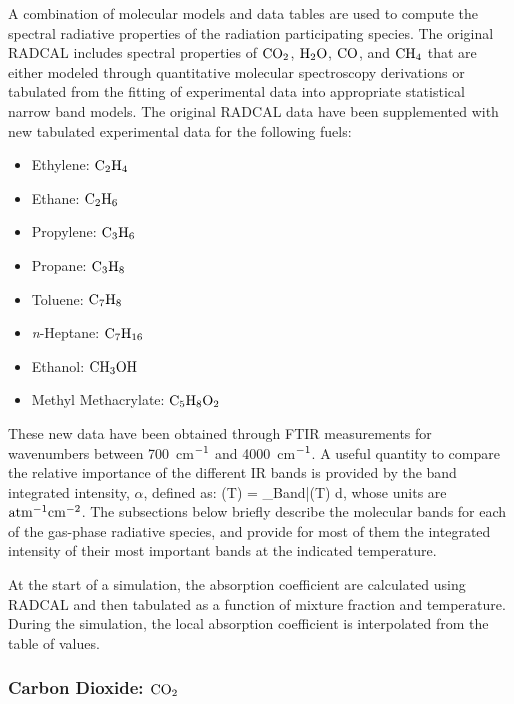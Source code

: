 A combination of molecular models and data tables are used to compute the spectral radiative
properties of the radiation participating species.
The original RADCAL includes spectral properties of $\rm CO_2$, $\rm H_2O$, $\rm CO$, and
$\rm CH_4$ that are either modeled through quantitative molecular spectroscopy derivations
or tabulated from the fitting of experimental data into appropriate statistical narrow band models.
The original RADCAL data have been supplemented with new tabulated experimental data
for the following fuels:
\begin{itemize}
  \item Ethylene:  $\rm C_2H_4$
  \item Ethane:    $\rm C_2H_6$
  \item Propylene: $\rm C_3H_6$
  \item Propane:   $\rm C_3H_8$
  \item Toluene:   $\rm C_7H_8$
  \item \textit{n}-Heptane: $\rm C_7H_{16}$
  \item Ethanol:   $\rm CH_3OH$
  \item Methyl Methacrylate: $\rm C_5H_8O_2$
\end{itemize}
These new data have been obtained through FTIR measurements for wavenumbers between 700~cm$\rm ^{-1}$ and 4000~cm$\rm ^{-1}$. A useful quantity to compare the relative importance of the different IR bands is provided by the band integrated intensity, $\alpha$, defined as:
\be
  \alpha(T) = \displaystyle\int_{Band}\bar{\kappa}(T) \; d\nu,
\ee
whose units are $\rm {atm^{-1} cm^{-2}}$. The subsections below briefly describe the molecular bands for each of the gas-phase radiative species, and provide for most of them the integrated intensity of their most important bands at the indicated temperature.

At the start of a simulation, the absorption coefficient are calculated using RADCAL and then tabulated as a function of mixture fraction and temperature. During the simulation, the local absorption coefficient is interpolated from the table of values.

\subsubsection{Carbon Dioxide: $\rm CO_2$}

